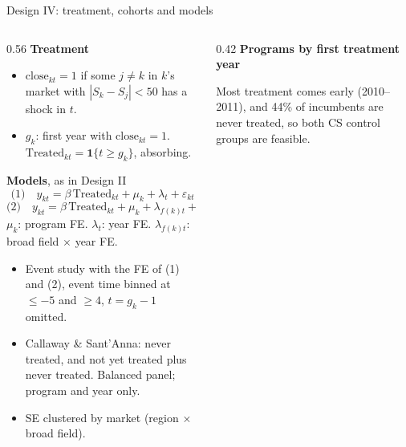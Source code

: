 \documentclass{beamer}
\begin{document}
\begin{frame}{Design IV: treatment, cohorts and models}
\scriptsize
\setlength{\abovedisplayskip}{2pt}
\setlength{\belowdisplayskip}{2pt}
\begin{columns}[T,onlytextwidth]
\begin{column}{0.56\textwidth}
\textbf{Treatment}
\begin{itemize}
    \item $\text{close}_{kt}=1$ if some $j\neq k$ in $k$'s market with $|S_k-S_j|<50$ has a shock in $t$.
    \item $g_k$: first year with $\text{close}_{kt}=1$. $\text{Treated}_{kt}=\mathbf 1\{t\ge g_k\}$, absorbing.
\end{itemize}

\textbf{Models}, as in Design II
\[
\text{(1)}\quad y_{kt}=\beta\,\text{Treated}_{kt}+\mu_k+\lambda_t+\varepsilon_{kt}
\]
\[
\text{(2)}\quad y_{kt}=\beta\,\text{Treated}_{kt}+\mu_k+\lambda_{f(k)t}+\varepsilon_{kt}
\]
{\tiny $\mu_k$: program FE. $\lambda_t$: year FE. $\lambda_{f(k)t}$: broad field $\times$ year FE.}
\begin{itemize}
    \item Event study with the FE of (1) and (2), event time binned at $\le-5$ and $\ge4$, $t=g_k-1$ omitted.
    \item Callaway \& Sant'Anna: never treated, and not yet treated plus never treated. Balanced panel; program and year only.
    \item SE clustered by market (region $\times$ broad field).
\end{itemize}
\end{column}
\begin{column}{0.42\textwidth}
\centering
\tiny
\textbf{Programs by first treatment year}

\vspace{0.05cm}
\resizebox{\linewidth}{!}{}

\vspace{0.1cm}
\raggedright
\scriptsize
Most treatment comes early (2010--2011), and 44\% of incumbents are never treated, so both CS control groups are feasible.
\end{column}
\end{columns}
\end{frame}
\end{document}
